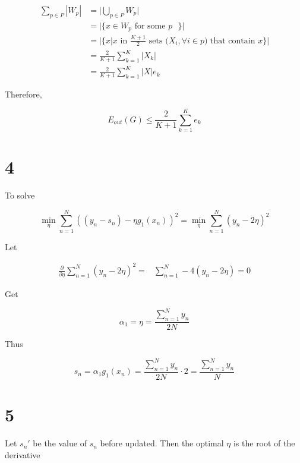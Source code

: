 \documentclass[fleqn,a4paper,12pt]{article}
\begin{document}
\begin{align*}
  \sum_{p \in P} |W_p|
  &= \lvert \bigcup_{p \in P} W_p \rvert \\
  &= \lvert \{ x \in W_p \text{ for some $p$ } \} \rvert \\
  &= \lvert \{ x | \text{$x$ in $\frac{K + 1}{2}$ sets ($X_i, \forall i \in p$) that contain $x$} \} \rvert \\
  &= \frac{2}{K + 1} \sum_{k=1}^{K} |X_k| \\
  &= \frac{2}{K + 1} \sum_{k=1}^{K} |X| e_k
\end{align*}


Therefore,

\begin{equation*}
  E_{out}(G) \leq \frac{2}{K + 1} \sum_{k=1}^{K} e_k
\end{equation*}

\section*{4}

To solve

\begin{equation*}
  \min_{\eta} \sum_{n=1}^N ((y_n - s_n) - \eta g_1(x_n))^2  =   \min_{\eta} \sum_{n=1}^N (y_n - 2 \eta )^2
\end{equation*}

Let

\begin{align*}
  \frac{\partial}{\partial \eta} \sum_{n=1}^N (y_n - 2 \eta)^2 
  =& \sum_{n=1}^N -4 (y_n - 2 \eta) = 0
\end{align*}

Get

\begin{equation*}
  \alpha_1 = \eta = \frac{\sum_{n=1}^N y_n}{2N} 
\end{equation*}

Thus

\begin{equation*}
  s_n = \alpha_1 g_1(x_n) = \frac{\sum_{n=1}^N y_n}{2N} \cdot 2 = \frac{\sum_{n=1}^N y_n}{N}
\end{equation*}

\section*{5}

Let $s_n'$ be the value of $s_n$ before updated. Then the optimal $\eta$ is the root of the derivative
\end{document}
